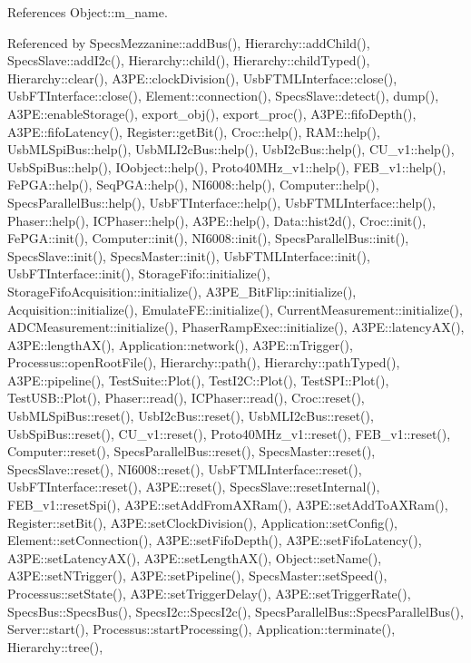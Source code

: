 References Object\+::m\+\_\+name.



Referenced by Specs\+Mezzanine\+::add\+Bus(), Hierarchy\+::add\+Child(), Specs\+Slave\+::add\+I2c(), Hierarchy\+::child(), Hierarchy\+::child\+Typed(), Hierarchy\+::clear(), A3\+P\+E\+::clock\+Division(), Usb\+F\+T\+M\+L\+Interface\+::close(), Usb\+F\+T\+Interface\+::close(), Element\+::connection(), Specs\+Slave\+::detect(), dump(), A3\+P\+E\+::enable\+Storage(), export\+\_\+obj(), export\+\_\+proc(), A3\+P\+E\+::fifo\+Depth(), A3\+P\+E\+::fifo\+Latency(), Register\+::get\+Bit(), Croc\+::help(), R\+A\+M\+::help(), Usb\+M\+L\+Spi\+Bus\+::help(), Usb\+M\+L\+I2c\+Bus\+::help(), Usb\+I2c\+Bus\+::help(), C\+U\+\_\+v1\+::help(), Usb\+Spi\+Bus\+::help(), I\+Oobject\+::help(), Proto40\+M\+Hz\+\_\+v1\+::help(), F\+E\+B\+\_\+v1\+::help(), Fe\+P\+G\+A\+::help(), Seq\+P\+G\+A\+::help(), N\+I6008\+::help(), Computer\+::help(), Specs\+Parallel\+Bus\+::help(), Usb\+F\+T\+Interface\+::help(), Usb\+F\+T\+M\+L\+Interface\+::help(), Phaser\+::help(), I\+C\+Phaser\+::help(), A3\+P\+E\+::help(), Data\+::hist2d(), Croc\+::init(), Fe\+P\+G\+A\+::init(), Computer\+::init(), N\+I6008\+::init(), Specs\+Parallel\+Bus\+::init(), Specs\+Slave\+::init(), Specs\+Master\+::init(), Usb\+F\+T\+M\+L\+Interface\+::init(), Usb\+F\+T\+Interface\+::init(), Storage\+Fifo\+::initialize(), Storage\+Fifo\+Acquisition\+::initialize(), A3\+P\+E\+\_\+\+Bit\+Flip\+::initialize(), Acquisition\+::initialize(), Emulate\+F\+E\+::initialize(), Current\+Measurement\+::initialize(), A\+D\+C\+Measurement\+::initialize(), Phaser\+Ramp\+Exec\+::initialize(), A3\+P\+E\+::latency\+A\+X(), A3\+P\+E\+::length\+A\+X(), Application\+::network(), A3\+P\+E\+::n\+Trigger(), Processus\+::open\+Root\+File(), Hierarchy\+::path(), Hierarchy\+::path\+Typed(), A3\+P\+E\+::pipeline(), Test\+Suite\+::\+Plot(), Test\+I2\+C\+::\+Plot(), Test\+S\+P\+I\+::\+Plot(), Test\+U\+S\+B\+::\+Plot(), Phaser\+::read(), I\+C\+Phaser\+::read(), Croc\+::reset(), Usb\+M\+L\+Spi\+Bus\+::reset(), Usb\+I2c\+Bus\+::reset(), Usb\+M\+L\+I2c\+Bus\+::reset(), Usb\+Spi\+Bus\+::reset(), C\+U\+\_\+v1\+::reset(), Proto40\+M\+Hz\+\_\+v1\+::reset(), F\+E\+B\+\_\+v1\+::reset(), Computer\+::reset(), Specs\+Parallel\+Bus\+::reset(), Specs\+Master\+::reset(), Specs\+Slave\+::reset(), N\+I6008\+::reset(), Usb\+F\+T\+M\+L\+Interface\+::reset(), Usb\+F\+T\+Interface\+::reset(), A3\+P\+E\+::reset(), Specs\+Slave\+::reset\+Internal(), F\+E\+B\+\_\+v1\+::reset\+Spi(), A3\+P\+E\+::set\+Add\+From\+A\+X\+Ram(), A3\+P\+E\+::set\+Add\+To\+A\+X\+Ram(), Register\+::set\+Bit(), A3\+P\+E\+::set\+Clock\+Division(), Application\+::set\+Config(), Element\+::set\+Connection(), A3\+P\+E\+::set\+Fifo\+Depth(), A3\+P\+E\+::set\+Fifo\+Latency(), A3\+P\+E\+::set\+Latency\+A\+X(), A3\+P\+E\+::set\+Length\+A\+X(), Object\+::set\+Name(), A3\+P\+E\+::set\+N\+Trigger(), A3\+P\+E\+::set\+Pipeline(), Specs\+Master\+::set\+Speed(), Processus\+::set\+State(), A3\+P\+E\+::set\+Trigger\+Delay(), A3\+P\+E\+::set\+Trigger\+Rate(), Specs\+Bus\+::\+Specs\+Bus(), Specs\+I2c\+::\+Specs\+I2c(), Specs\+Parallel\+Bus\+::\+Specs\+Parallel\+Bus(), Server\+::start(), Processus\+::start\+Processing(), Application\+::terminate(), Hierarchy\+::tree(), 
